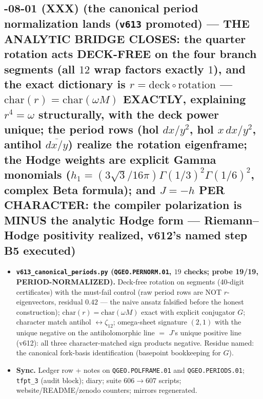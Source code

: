 \documentclass[11pt]{article}
\begin{document}
\subsection*{-08-01 (XXX) (the canonical period normalization lands (\texttt{v613} promoted) --- THE ANALYTIC BRIDGE CLOSES: the quarter rotation acts DECK-FREE on the four branch segments (all $12$ wrap factors exactly $1$), and the exact dictionary is $r=\mathrm{deck}\circ\mathrm{rotation}$ --- $\mathrm{char}(r)=\mathrm{char}(\omega M)$ EXACTLY, explaining $r^4=\omega$ structurally, with the deck power unique; the period rows (hol $dx/y^2$, hol $x\,dx/y^2$, antihol $\overline{dx/y}$) realize the rotation eigenframe; the Hodge weights are explicit Gamma monomials ($h_1=(3\sqrt3/16\pi)\Gamma(1/3)^2\Gamma(1/6)^2$, complex Beta formula); and $J=-h$ PER CHARACTER: the compiler polarization is MINUS the analytic Hodge form --- Riemann--Hodge positivity realized, v612's named step B5 executed)}
\begin{itemize}[leftmargin=1.5em]
\item \textbf{\texttt{v613\_canonical\_periods.py} (\texttt{QGEO.PERNORM.01}, $19$ checks;
probe 19/19, PERIOD-NORMALIZED).} Deck-free rotation on segments (40-digit certificates)
with the must-fail control (raw period rows are NOT $r$-eigenvectors, residual $0.42$ ---
the naive ansatz falsified before the honest construction); $\mathrm{char}(r)=
\mathrm{char}(\omega M)$ exact with explicit conjugator $G$; character match antihol
$\leftrightarrow\zeta_{12}$; omega-sheet signature $(2,1)$ with the unique negative on the
antiholomorphic line $=$ $J$'s unique positive line (v612): all three character-matched
sign products negative.  Residue named: the canonical fork-basis identification
(basepoint bookkeeping for $G$).
\item \textbf{Sync.} Ledger row + notes on \texttt{QGEO.POLFRAME.01} and
\texttt{QGEO.PERIODS.01}; \texttt{tfpt\_3} (audit block); diary; suite $606\to607$
scripts; website/README/zenodo counters; mirrors regenerated.
\end{itemize}
\end{document}

